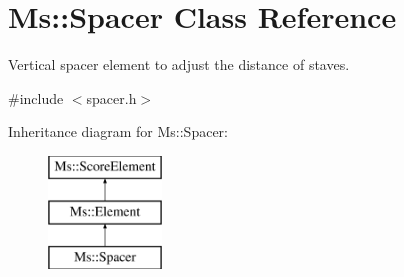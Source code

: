 \hypertarget{class_ms_1_1_spacer}{}\section{Ms\+:\+:Spacer Class Reference}
\label{class_ms_1_1_spacer}


Vertical spacer element to adjust the distance of staves.  




{\ttfamily \#include $<$spacer.\+h$>$}

Inheritance diagram for Ms\+:\+:Spacer\+:\begin{figure}[H]
\begin{center}
\leavevmode
\includegraphics[height=3.000000cm]{class_ms_1_1_spacer}
\end{center}
\end{figure}
